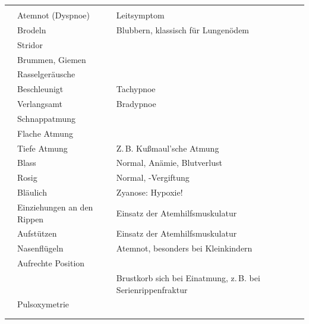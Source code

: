 \begin{table}[H]
\begin{WidePar}
\TableBaseModification
{}

\begin{tabulary}{\linewidth}[H]{LLLL}
\toprule\addlinespace
\noindent{}
 &
\noindent{}
 &
\noindent{}
 &
\\\addlinespace\midrule\addlinespace
{}
 &
Atemnot (Dyspnoe) 
 &
Leitsymptom
 &
\\\addlinespace
{}
 &
Brodeln 
 &
Blubbern, klassisch für Lungenödem
 &
\\\addlinespace
 &
Stridor 
 &
 &
\\\addlinespace
 &
Brummen, Giemen
& &
\\\addlinespace
 &
Rasselgeräusche 
 &
 &
\\\addlinespace
{}
 &
Beschleunigt
 &
Tachypnoe 
 &
\\\addlinespace
 &
Verlangsamt
 &
Bradypnoe 
 &
\\\addlinespace
{}
 &
Schnappatmung
 &
 &
\\\addlinespace
 &
Flache Atmung
 &
 &
\\\addlinespace
 &
Tiefe Atmung
 &
Z.\,B. Kußmaul'sche Atmung
 &
\\\addlinespace
{}
 &
Blass
 &
Normal, Anämie, Blutverlust
 &
\\\addlinespace
 &
Rosig
 &
Normal, -Vergiftung
 &
\\\addlinespace
 &
Bläulich 
 &
Zyanose: Hypoxie!
 &
\\\addlinespace
{}
 &
Einziehungen an den Rippen
&
Einsatz der Atemhilfsmuskulatur
&
\\\addlinespace
&
Aufstützen
&
Einsatz der Atemhilfsmuskulatur
&
\\\addlinespace
&
Nasenflügeln 
&
Atemnot, besonders bei Kleinkindern
&
\\\addlinespace
&
Aufrechte Position
&
&
\\\addlinespace
&
&
Brustkorb  sich bei Einatmung, z.\,B. bei
Serienrippenfraktur 
&
\\\addlinespace
{}
&
Pulsoxymetrie
&
&
\\\addlinespace
&
&
\\\addlinespace\bottomrule
\end{tabulary}
\end{WidePar}

\end{table}


